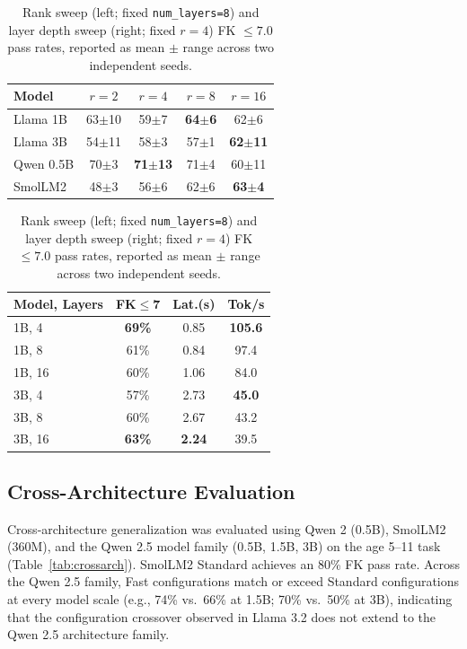 \documentclass[pdflatex,sn-mathphys-num]{sn-jnl-official}%
\begin{document}
\begin{table}[!h]
  \centering
  \caption{Rank sweep (left; fixed \texttt{num\_layers=8}) and layer depth sweep (right; fixed $r=4$) FK $\leq 7.0$ pass rates, reported as mean $\pm$ range across two independent seeds.}
  \label{tab:sweeps}
  \scriptsize
  \setlength{\tabcolsep}{3pt}
  \begin{tabular}{@{}lcccc@{}}
    \toprule
    Model     & $r{=}2$ & $r{=}4$ & $r{=}8$ & $r{=}16$ \\
    \midrule
    Llama 1B  & 63$\pm$10 & 59$\pm$7 & \textbf{64$\pm$6} & 62$\pm$6 \\
    Llama 3B  & 54$\pm$11 & 58$\pm$3 & 57$\pm$1 & \textbf{62$\pm$11} \\
    Qwen 0.5B & 70$\pm$3 & \textbf{71$\pm$13} & 71$\pm$4 & 60$\pm$11 \\
    SmolLM2   & 48$\pm$3 & 56$\pm$6 & 62$\pm$6 & \textbf{63$\pm$4} \\
    \bottomrule
  \end{tabular}
  \qquad
  \begin{tabular}{@{}lccc@{}}
    \toprule
    Model, Layers & FK$\leq$7 & Lat.(s) & Tok/s \\
    \midrule
    1B, 4  & \textbf{69\%} & 0.85 & \textbf{105.6} \\
    1B, 8  & 61\% & 0.84 & 97.4 \\
    1B, 16 & 60\% & 1.06 & 84.0 \\
    3B, 4  & 57\% & 2.73 & \textbf{45.0} \\
    3B, 8  & 60\% & 2.67 & 43.2 \\
    3B, 16 & \textbf{63\%} & \textbf{2.24} & 39.5 \\
    \bottomrule
  \end{tabular}
\end{table}

\subsection{Cross-Architecture Evaluation}\label{sec:crossarch}

Cross-architecture generalization was evaluated using Qwen 2 (0.5B), SmolLM2 (360M), and the Qwen 2.5 model family (0.5B, 1.5B, 3B) on the age 5--11 task (Table~\ref{tab:crossarch}). SmolLM2 Standard achieves an 80\% FK pass rate. Across the Qwen 2.5 family, Fast configurations match or exceed Standard configurations at every model scale (e.g., 74\% vs.\ 66\% at 1.5B; 70\% vs.\ 50\% at 3B), indicating that the configuration crossover observed in Llama 3.2 does not extend to the Qwen 2.5 architecture family.
\end{document}
